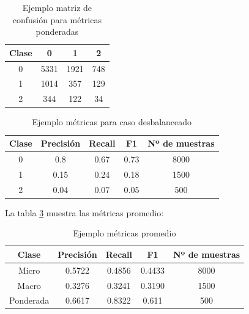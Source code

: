 \begin{table}[H]
	\centering
	\captionsetup{justification=centering}
	\begin{tabular}{|c|c|c|c|}
		\hline
		Clase & 0    & 1    & 2   \\ \hline
		0     & 5331 & 1921 & 748 \\ \hline
		1     & 1014 & 357  & 129 \\ \hline
		2     & 344  & 122  & 34  \\ \hline
	\end{tabular}
	\caption{Ejemplo matriz de confusión para métricas ponderadas}
	\label{tab:ejemplo_promedios}
\end{table} 

\begin{table}[H]
	\centering
	\captionsetup{justification=centering}
	\begin{tabular}{|c|c|c|c|c|}
		\hline
		Clase & Precisión & Recall & F1   & Nº de muestras \\ \hline
		0     & 0.8       & 0.67   & 0.73 & 8000           \\ \hline
		1     & 0.15      & 0.24   & 0.18 & 1500           \\ \hline
		2     & 0.04      & 0.07   & 0.05 & 500            \\ \hline
	\end{tabular}
	\caption{Ejemplo métricas para caso desbalanceado}
	\label{tab:ejemplo_promedios_metricas}
\end{table}

La tabla \ref{tab:ejemplo_promedios_metricas2} muestra las métricas promedio:

\begin{table}[H]
	\centering
	\captionsetup{justification=centering}
	\begin{tabular}{|c|c|c|c|c|}
		\hline
		Clase     & Precisión & Recall & F1     & Nº de muestras \\ \hline
		Micro     & 0.5722    & 0.4856 & 0.4433 & 8000           \\ \hline
		Macro     & 0.3276    & 0.3241 & 0.3190 & 1500           \\ \hline
		Ponderada & 0.6617    & 0.8322 & 0.611  & 500            \\ \hline
	\end{tabular}
	\caption{Ejemplo métricas promedio}
	\label{tab:ejemplo_promedios_metricas2}
\end{table}

